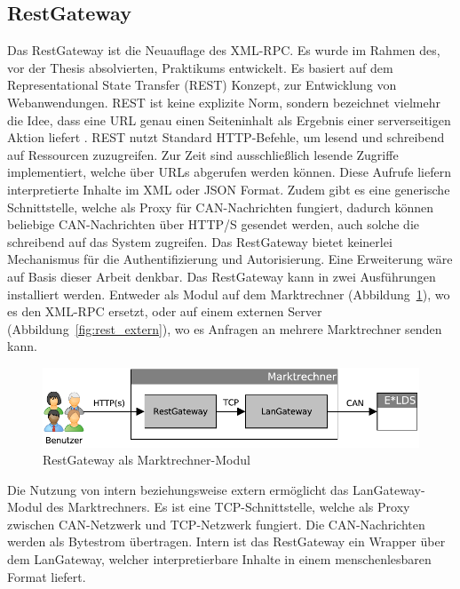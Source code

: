 \documentclass[11pt,a4paper]{report}
\begin{document}
\subsection{RestGateway} 
Das RestGateway ist die Neuauflage des XML-RPC. Es wurde im Rahmen des, vor der Thesis absolvierten, Praktikums entwickelt. Es basiert auf dem Representational State Transfer (REST) Konzept, zur Entwicklung von Webanwendungen. REST ist keine explizite Norm, sondern bezeichnet vielmehr die Idee, dass eine URL genau einen Seiteninhalt als Ergebnis einer serverseitigen Aktion liefert \cite{wiki_rest}. REST nutzt Standard HTTP-Befehle, um lesend und schreibend auf Ressourcen zuzugreifen. Zur Zeit sind ausschließlich lesende Zugriffe implementiert, welche über URLs abgerufen werden können. Diese Aufrufe liefern interpretierte Inhalte im XML oder JSON Format. Zudem gibt es eine generische Schnittstelle, welche als Proxy für CAN-Nachrichten fungiert, dadurch können beliebige CAN-Nachrichten über HTTP/S gesendet werden, auch solche die schreibend auf das System zugreifen. Das RestGateway bietet keinerlei Mechanismus für die Authentifizierung und Autorisierung. Eine Erweiterung wäre auf Basis dieser Arbeit denkbar. Das RestGateway kann in zwei Ausführungen installiert werden. Entweder als Modul auf dem Marktrechner (Abbildung~\ref{fig:rest_intern}), wo es den XML-RPC ersetzt, oder auf einem externen Server (Abbildung~\ref{fig:rest_extern}), wo es Anfragen an mehrere Marktrechner senden kann. 

\begin{figure}[htbp]
\centering
\includegraphics[scale=0.7]{images/RestGateway_intern.pdf}
\caption[]{RestGateway als Marktrechner-Modul}
\label{fig:rest_intern}
\end{figure}

Die Nutzung von intern beziehungsweise extern ermöglicht das LanGateway-Modul des Marktrechners. Es ist eine TCP-Schnittstelle, welche als Proxy zwischen CAN-Netzwerk und TCP-Netzwerk fungiert. Die CAN-Nachrichten werden als Bytestrom übertragen. Intern ist das RestGateway ein Wrapper über dem LanGateway, welcher interpretierbare Inhalte in einem menschenlesbaren Format liefert.
\end{document}
